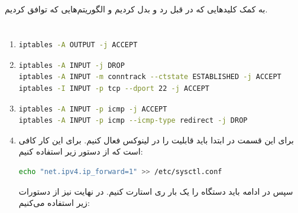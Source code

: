 \documentclass[]{article}
\begin{document}
\subsection{}
به کمک کلید‌هایی که در قبل رد و بدل کردیم و الگوریتم‌هایی که توافق کردیم.
\section{}
\begin{enumerate}
    \item {} \begin{latin}
\begin{lstlisting}[language=sh]
iptables -A OUTPUT -j ACCEPT
\end{lstlisting}
    \end{latin}
    \item {}  \begin{latin}
\begin{lstlisting}[language=sh]
iptables -A INPUT -j DROP
iptables -A INPUT -m conntrack --ctstate ESTABLISHED -j ACCEPT
iptables -I INPUT -p tcp --dport 22 -j ACCEPT
\end{lstlisting}
\end{latin}
    \item {} \begin{latin}
\begin{lstlisting}[language=sh]
iptables -A INPUT -p icmp -j ACCEPT
iptables -A INPUT -p icmp --icmp-type redirect -j DROP
\end{lstlisting}
    \end{latin}
    \item برای این قسمت در ابتدا باید قابلیت  را در لینوکس فعال کنیم. برای این کار کافی است که از دستور زیر استفاده کنیم: \begin{latin}
\begin{lstlisting}[language=sh]
echo "net.ipv4.ip_forward=1" >> /etc/sysctl.conf
\end{lstlisting}
\end{latin}
    سپس در ادامه باید دستگاه را یک بار ری استارت کنیم. در نهایت نیز از دستورات زیر استفاده می‌کنیم: 

\end{enumerate}
\end{document}
